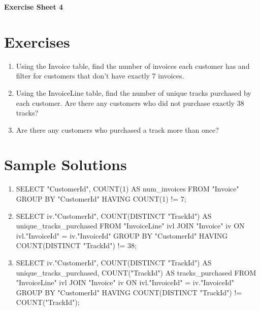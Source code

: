 \documentclass[USenglish,final,authoryear,12pt]{article}
\begin{document}
\textbf{\LARGE Exercise Sheet 4}\newline
\section{Exercises}
\begin{enumerate}
	\item Using the Invoice table, find the number of invoices each customer has and filter for customers that don't have exactly 7 invoices.
	\item Using the InvoiceLine table, find the number of unique tracks purchased by each customer. Are there any customers who did not purchase exactly 38 tracks?
	\item Are there any customers who purchased a track more than once?
\end{enumerate}
\pagebreak

\section{Sample Solutions}
\begin{enumerate}
	\item SELECT "CustomerId",\newline
	COUNT(1) AS num\_invoices\newline
	FROM "Invoice"\newline
	GROUP BY "CustomerId"\newline
	HAVING COUNT(1) != 7;
	\item SELECT iv."CustomerId",\newline
	COUNT(DISTINCT "TrackId") AS unique\_tracks\_purchased\newline
	FROM "InvoiceLine" ivl\newline
	JOIN "Invoice" iv\newline
	ON ivl."InvoiceId" = iv."InvoiceId"\newline
	GROUP BY "CustomerId"\newline
	HAVING COUNT(DISTINCT "TrackId") != 38;
	\item SELECT iv."CustomerId",
	COUNT(DISTINCT "TrackId") AS unique\_tracks\_purchased,
	COUNT("TrackId") AS tracks\_purchased
	FROM "InvoiceLine" ivl
	JOIN "Invoice" iv
	ON ivl."InvoiceId" = iv."InvoiceId"
	GROUP BY "CustomerId"
	HAVING COUNT(DISTINCT "TrackId") != COUNT("TrackId");
\end{enumerate}
\end{document}
